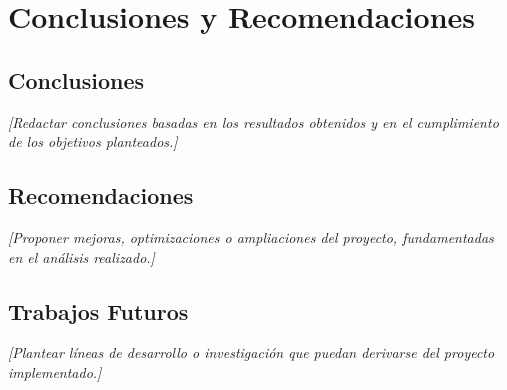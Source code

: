 \chapter{Conclusiones y Recomendaciones}

\section{Conclusiones}
\textit{[Redactar conclusiones basadas en los resultados obtenidos y en el cumplimiento de los objetivos planteados.]}

\section{Recomendaciones}
\textit{[Proponer mejoras, optimizaciones o ampliaciones del proyecto, fundamentadas en el análisis realizado.]}

\section{Trabajos Futuros}
\textit{[Plantear líneas de desarrollo o investigación que puedan derivarse del proyecto implementado.]}
